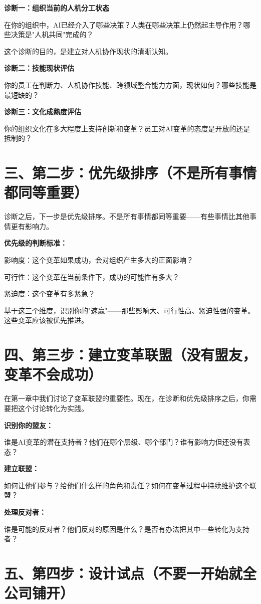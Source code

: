 \textbf{诊断一：组织当前的人机分工状态}

在你的组织中，AI已经介入了哪些决策？人类在哪些决策上仍然起主导作用？哪些决策是"人机共同"完成的？

这个诊断的目的，是建立对人机协作现状的清晰认知。

\textbf{诊断二：技能现状评估}

你的员工在判断力、人机协作技能、跨领域整合能力方面，现状如何？哪些技能是最短缺的？

\textbf{诊断三：文化成熟度评估}

你的组织文化在多大程度上支持创新和变革？员工对AI变革的态度是开放的还是抵制的？

\section{三、第二步：优先级排序（不是所有事情都同等重要）}


诊断之后，下一步是优先级排序。不是所有事情都同等重要——有些事情比其他事情更有影响力。

\textbf{优先级的判断标准：}

影响度：这个变革如果成功，会对组织产生多大的正面影响？

可行性：这个变革在当前条件下，成功的可能性有多大？

紧迫度：这个变革有多紧急？

基于这三个维度，识别你的"速赢"——那些影响大、可行性高、紧迫性强的变革。这些变革应该被优先推进。

\section{四、第三步：建立变革联盟（没有盟友，变革不会成功）}


在第一章中我们讨论了变革联盟的重要性。现在，在诊断和优先级排序之后，你需要把这个讨论转化为实践。

\textbf{识别你的盟友：}

谁是AI变革的潜在支持者？他们在哪个层级、哪个部门？谁有影响力但还没有表态？

\textbf{建立联盟：}

如何让他们参与？给他们什么样的角色和责任？如何在变革过程中持续维护这个联盟？

\textbf{处理反对者：}

谁是可能的反对者？他们反对的原因是什么？是否有办法把其中一些转化为支持者？

\section{五、第四步：设计试点（不要一开始就全公司铺开）}


